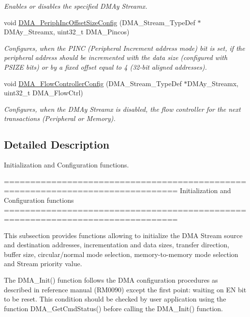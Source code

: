 \begin{DoxyCompactItemize}
\begin{DoxyCompactList}\small\item\em Enables or disables the specified D\-M\-Ay Streamx. \end{DoxyCompactList}\item 
void \hyperlink{group___d_m_a___group1_ga210a9861460b3c9b3fa14fdc1a949744}{D\-M\-A\-\_\-\-Periph\-Inc\-Offset\-Size\-Config} (D\-M\-A\-\_\-\-Stream\-\_\-\-Type\-Def $\ast$D\-M\-Ay\-\_\-\-Streamx, uint32\-\_\-t D\-M\-A\-\_\-\-Pincos)
\begin{DoxyCompactList}\small\item\em Configures, when the P\-I\-N\-C (Peripheral Increment address mode) bit is set, if the peripheral address should be incremented with the data size (configured with P\-S\-I\-Z\-E bits) or by a fixed offset equal to 4 (32-\/bit aligned addresses). \end{DoxyCompactList}\item 
void \hyperlink{group___d_m_a___group1_ga77f7628f6be9d6d088127eceb090b8b2}{D\-M\-A\-\_\-\-Flow\-Controller\-Config} (D\-M\-A\-\_\-\-Stream\-\_\-\-Type\-Def $\ast$D\-M\-Ay\-\_\-\-Streamx, uint32\-\_\-t D\-M\-A\-\_\-\-Flow\-Ctrl)
\begin{DoxyCompactList}\small\item\em Configures, when the D\-M\-Ay Streamx is disabled, the flow controller for the next transactions (Peripheral or Memory). \end{DoxyCompactList}\end{DoxyCompactItemize}


\subsection{Detailed Description}
Initialization and Configuration functions. \begin{DoxyVerb} ===============================================================================
                 Initialization and Configuration functions
 ===============================================================================  

  This subsection provides functions allowing to initialize the DMA Stream source
  and destination addresses, incrementation and data sizes, transfer direction, 
  buffer size, circular/normal mode selection, memory-to-memory mode selection 
  and Stream priority value.
  
  The DMA_Init() function follows the DMA configuration procedures as described in
  reference manual (RM0090) except the first point: waiting on EN bit to be reset.
  This condition should be checked by user application using the function DMA_GetCmdStatus()
  before calling the DMA_Init() function.\end{DoxyVerb}
 

